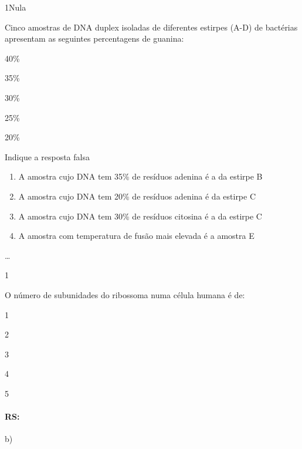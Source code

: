 \documentclass[\mainfilename]{subfiles}
\begin{document}
\begin{questionBox}1{Nula}
    
    Cinco amostras de DNA duplex  isoladas de diferentes  estirpes (A-D) de bactérias apresentam as seguintes percentagens de guanina: 

    \begin{enumerate}[
        label={Estirpe \Alph*.}, 
        left=1em
    ]
        \begin{multicols}{2}
            \item 40\%
            \item 35\%
            \item 30\%
            \item 25\%
            \item 20\%
        \end{multicols}
    \end{enumerate}

    Indique a resposta falsa
    \begin{enumerate}
        \item A amostra  cujo DNA   tem  35\%  de resíduos adenina é a da  estirpe B
        \item A amostra  cujo DNA   tem  20\%  de resíduos adenina é da estirpe C
        \item A amostra  cujo DNA   tem  30\% de resíduos citosina  é a da  estirpe C
        \item A amostra com temperatura de fusão mais elevada é a amostra E 
    \end{enumerate}

    \dots
    
\end{questionBox}

\begin{questionBox}1{}
    
    O número de subunidades do ribossoma numa célula humana é de:
    \begin{enumerate}[label=\alph*)]
        \begin{multicols}{3}
            \item 1
            \item 2
            \item 3
            \item 4
            \item 5
        \end{multicols}
    \end{enumerate}

    \paragraph{RS:} b)
    
\end{questionBox}
\end{document}
